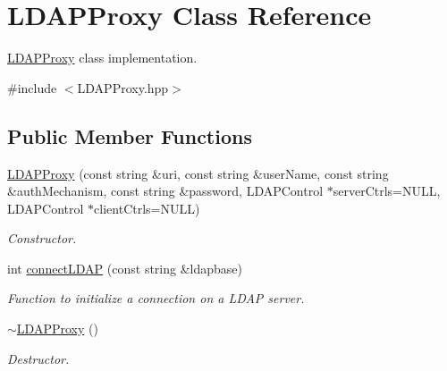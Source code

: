 \hypertarget{classLDAPProxy}{
\section{LDAPProxy Class Reference}
\label{classLDAPProxy}
}


\hyperlink{classLDAPProxy}{LDAPProxy} class implementation.  




{\ttfamily \#include $<$LDAPProxy.hpp$>$}

\subsection*{Public Member Functions}
\begin{DoxyCompactItemize}
\item 
\hyperlink{classLDAPProxy_aac822777e834894496c1e0f2458afd70}{LDAPProxy} (const string \&uri, const string \&userName, const string \&authMechanism, const string \&password, LDAPControl $\ast$serverCtrls=NULL, LDAPControl $\ast$clientCtrls=NULL)
\begin{DoxyCompactList}\small\item\em Constructor. \item\end{DoxyCompactList}\item 
int \hyperlink{classLDAPProxy_a3bcc20d5a8830e21438e60143d014d11}{connectLDAP} (const string \&ldapbase)
\begin{DoxyCompactList}\small\item\em Function to initialize a connection on a LDAP server. \item\end{DoxyCompactList}\item 
\hypertarget{classLDAPProxy_aa232923a22cf311ecf941d7dc02ef896}{
\hyperlink{classLDAPProxy_aa232923a22cf311ecf941d7dc02ef896}{$\sim$LDAPProxy} ()}
\label{classLDAPProxy_aa232923a22cf311ecf941d7dc02ef896}

\begin{DoxyCompactList}\small\item\em Destructor. \item\end{DoxyCompactList}\end{DoxyCompactItemize}
